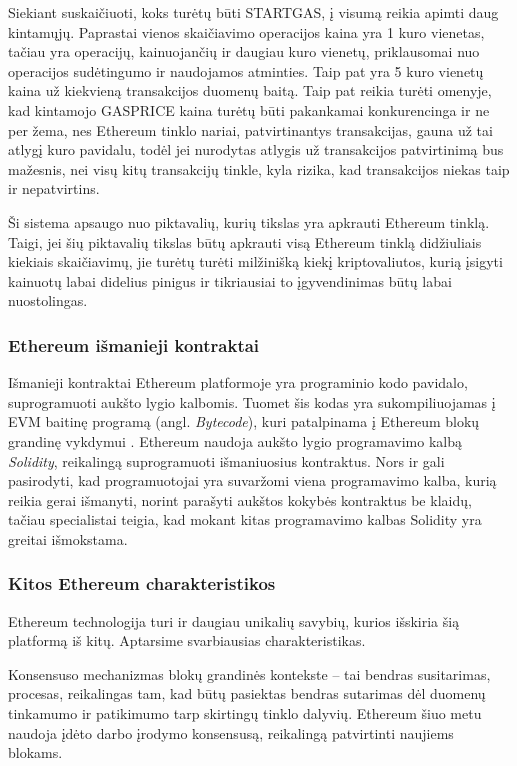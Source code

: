 \documentclass{VUMIFPSkursinis}
\begin{document}
Siekiant suskaičiuoti, koks turėtų būti STARTGAS, į visumą reikia apimti daug kintamųjų. Paprastai vienos skaičiavimo operacijos kaina yra 1 kuro vienetas, tačiau yra operacijų, kainuojančių ir daugiau kuro vienetų, priklausomai nuo operacijos sudėtingumo ir naudojamos atminties. Taip pat yra 5 kuro vienetų kaina už kiekvieną transakcijos duomenų baitą. Taip pat reikia turėti omenyje, kad kintamojo GASPRICE kaina turėtų būti pakankamai konkurencinga ir ne per žema, nes Ethereum tinklo nariai, patvirtinantys transakcijas, gauna už tai atlygį kuro pavidalu, todėl jei nurodytas atlygis už transakcijos patvirtinimą bus mažesnis, nei visų kitų transakcijų tinkle, kyla rizika, kad transakcijos niekas taip ir nepatvirtins. 

Ši sistema apsaugo nuo piktavalių, kurių tikslas yra apkrauti Ethereum tinklą. Taigi, jei šių piktavalių tikslas būtų apkrauti visą Ethereum tinklą didžiuliais kiekiais skaičiavimų, jie turėtų turėti milžinišką kiekį kriptovaliutos, kurią įsigyti kainuotų labai didelius pinigus ir tikriausiai to įgyvendinimas būtų labai nuostolingas.

\subsubsection{Ethereum išmanieji kontraktai}
Išmanieji kontraktai Ethereum platformoje yra programinio kodo pavidalo, suprogramuoti aukšto lygio kalbomis. Tuomet šis kodas yra sukompiliuojamas į EVM baitinę programą (angl. \textit{Bytecode}), kuri patalpinama į Ethereum blokų grandinę vykdymui \cite{hildenbrandt2017kevm}. Ethereum naudoja aukšto lygio programavimo kalbą \textit{Solidity}, reikalingą suprogramuoti išmaniuosius kontraktus. Nors ir gali pasirodyti, kad programuotojai yra suvaržomi viena programavimo kalba, kurią reikia gerai išmanyti, norint parašyti aukštos kokybės kontraktus be klaidų, tačiau specialistai teigia, kad mokant kitas programavimo kalbas Solidity yra greitai išmokstama.

\subsubsection{Kitos Ethereum charakteristikos}
Ethereum technologija turi ir daugiau unikalių savybių, kurios išskiria šią platformą iš kitų. Aptarsime svarbiausias charakteristikas.

Konsensuso mechanizmas blokų grandinės kontekste – tai bendras susitarimas, procesas, reikalingas tam, kad būtų pasiektas bendras sutarimas dėl duomenų tinkamumo ir patikimumo tarp skirtingų tinklo dalyvių. Ethereum šiuo metu naudoja įdėto darbo įrodymo konsensusą, reikalingą patvirtinti naujiems blokams.
\end{document}
